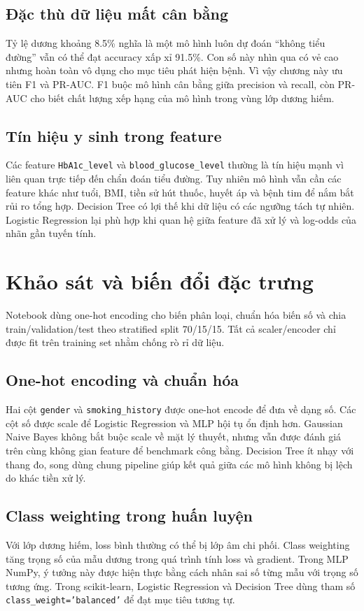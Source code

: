 \documentclass[12pt,a4paper]{report}
\begin{document}
\subsection{Đặc thù dữ liệu mất cân bằng}
Tỷ lệ dương khoảng 8.5\% nghĩa là một mô hình luôn dự đoán ``không tiểu đường'' vẫn có thể đạt accuracy xấp xỉ 91.5\%.
Con số này nhìn qua có vẻ cao nhưng hoàn toàn vô dụng cho mục tiêu phát hiện bệnh.
Vì vậy chương này ưu tiên F1 và PR-AUC.
F1 buộc mô hình cân bằng giữa precision và recall, còn PR-AUC cho biết chất lượng xếp hạng của mô hình trong vùng lớp dương hiếm.

\subsection{Tín hiệu y sinh trong feature}
Các feature \texttt{HbA1c\_level} và \texttt{blood\_glucose\_level} thường là tín hiệu mạnh vì liên quan trực tiếp đến chẩn đoán tiểu đường.
Tuy nhiên mô hình vẫn cần các feature khác như tuổi, BMI, tiền sử hút thuốc, huyết áp và bệnh tim để nắm bắt rủi ro tổng hợp.
Decision Tree có lợi thế khi dữ liệu có các ngưỡng tách tự nhiên.
Logistic Regression lại phù hợp khi quan hệ giữa feature đã xử lý và log-odds của nhãn gần tuyến tính.

\section{Khảo sát và biến đổi đặc trưng}
Notebook dùng one-hot encoding cho biến phân loại, chuẩn hóa biến số và chia train/validation/test theo stratified split 70/15/15. Tất cả scaler/encoder chỉ được fit trên training set nhằm chống rò rỉ dữ liệu.

\subsection{One-hot encoding và chuẩn hóa}
Hai cột \texttt{gender} và \texttt{smoking\_history} được one-hot encode để đưa về dạng số.
Các cột số được scale để Logistic Regression và MLP hội tụ ổn định hơn.
Gaussian Naive Bayes không bắt buộc scale về mặt lý thuyết, nhưng vẫn được đánh giá trên cùng không gian feature để benchmark công bằng.
Decision Tree ít nhạy với thang đo, song dùng chung pipeline giúp kết quả giữa các mô hình không bị lệch do khác tiền xử lý.

\subsection{Class weighting trong huấn luyện}
Với lớp dương hiếm, loss bình thường có thể bị lớp âm chi phối.
Class weighting tăng trọng số của mẫu dương trong quá trình tính loss và gradient.
Trong MLP NumPy, ý tưởng này được hiện thực bằng cách nhân sai số từng mẫu với trọng số tương ứng.
Trong scikit-learn, Logistic Regression và Decision Tree dùng tham số \texttt{class\_weight='balanced'} để đạt mục tiêu tương tự.
\end{document}

